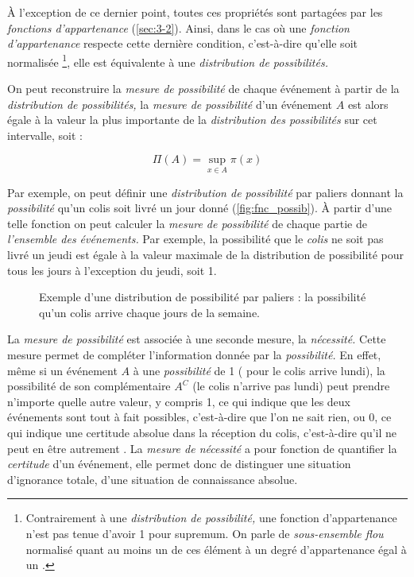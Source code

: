 À l'exception de ce dernier point, toutes ces propriétés sont
partagées par les \emph{fonctions d'appartenance}
(\autoref{sec:3-2}). Ainsi, dans le cas où une \emph{fonction
  d'appartenance} respecte cette dernière condition, c'est-à-dire
qu'elle soit normalisée \footnote{Contrairement à une
  \emph{distribution de possibilité,} une fonction d'appartenance
  n'est pas tenue d'avoir 1 pour supremum. On parle de
  \emph{sous-ensemble flou} normalisé quant au moins un de ces élément
  à un degré d’appartenance égal à un
  \autocite{Bouchon-Meunier2007}.}, elle est équivalente à une
\emph{distribution de possibilités.}

On peut reconstruire la \emph{mesure de possibilité} de chaque
événement à partir de la \emph{distribution de possibilités,} la
\emph{mesure de possibilité} d'un événement \(A\) est alors égale à la
valeur la plus importante de la \emph{distribution des possibilités}
sur cet intervalle, soit :

\begin{equation}
  \Pi(A) = \sup_{x \in A}\pi(x)
\end{equation}

Par exemple, on peut définir une \emph{distribution de possibilité}
par paliers donnant la \emph{possibilité} qu'un colis soit livré un
jour donné (\autoref{fig:fnc_possib}). À partir d'une telle fonction
on peut calculer la \emph{mesure de possibilité} de chaque partie de
\emph{l'ensemble des événements.} Par exemple, la possibilité que le
\emph{colis} ne soit pas livré un jeudi est égale à la valeur maximale
de la distribution de possibilité pour tous les jours à l'exception du
jeudi, soit 1.

\begin{figure}[hb]
  \centering
  
  \caption{Exemple d'une distribution de possibilité par paliers : la
    possibilité qu'un colis arrive chaque jours de la semaine.}
  \label{fig:fnc_possib}
\end{figure}

La \emph{mesure de possibilité} est associée à une seconde mesure, la
\emph{nécessité.} Cette mesure permet de compléter l'information
donnée par la \emph{possibilité.} En effet, même si un événement \(A\)
à une \emph{possibilité} de 1 ( pour le colis arrive lundi), la
possibilité de son complémentaire \(A^C\) (\ie le colis n'arrive pas
lundi) peut prendre n'importe quelle autre valeur, y compris 1, ce qui
indique que les deux événements sont tout à fait possibles,
c'est-à-dire que l'on ne sait rien, ou 0, ce qui indique une certitude
absolue dans la réception du colis, c'est-à-dire qu'il ne peut en être
autrement \autocite{Bouchon-Meunier1995}. La \emph{mesure de
  nécessité} a pour fonction de quantifier la \emph{certitude} d'un
événement, elle permet donc de distinguer une situation d'ignorance
totale, d'une situation de connaissance absolue. 

